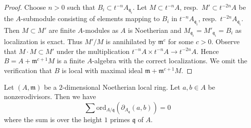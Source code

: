 \begin{proof}
Choose $n > 0$ such that $B_i \subset t^{-n}A_{\mathfrak q_i}$.
Let $M \subset t^{-n}A$, resp.\ $M' \subset t^{-2n}A$ be the
$A$-submodule consisting of elements mapping to $B_i$ in
$t^{-n}A_{\mathfrak q_i}$, resp.\ $t^{-2n}A_{\mathfrak q_i}$.
Then $M \subset M'$ are finite $A$-modules as $A$ is Noetherian
and $M_{\mathfrak q_i} = M'_{\mathfrak q_i} = B_i$ as localization
is exact. Thus $M'/M$ is annihilated by $\mathfrak m^c$ for some
$c > 0$. Observe that $M \cdot M \subset M'$ under the multiplication
$t^{-n}A \times t^{-n}A \to t^{-2n}A$. Hence
$B = A + \mathfrak m^{c + 1}M$ is a finite $A$-algebra with the correct
localizations. We omit the verification that $B$ is local with
maximal ideal $\mathfrak m + \mathfrak m^{c + 1}M$.
\end{proof}

\begin{lemma}
\label{lemma-key-nonzerodivisors}
Let $(A, \mathfrak m)$ be a $2$-dimensional Noetherian local ring.
Let $a, b \in A$ be nonzerodivisors.
Then we have
$$
\sum
\text{ord}_{A/\mathfrak q}(\partial_{A_{\mathfrak q}}(a, b))
=
0
$$
where the sum is over the height $1$ primes $\mathfrak q$ of $A$.
\end{lemma}


